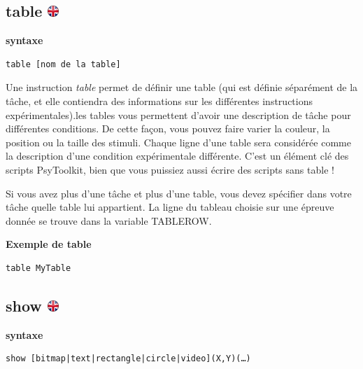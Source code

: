 \documentclass[
]{book}
\begin{document}
\hypertarget{table}{%
\subsection[table ]{\texorpdfstring{table
\href{https://www.psytoolkit.org/doc3.2.0/syntax.html\#table}{\protect\includegraphics{img/ukflag.png}}}{table }}\label{table}}

\textbf{syntaxe}

\begin{verbatim}
table [nom de la table]
\end{verbatim}

Une instruction \emph{table} permet de définir une table (qui est
définie séparément de la tâche, et elle contiendra des informations sur
les différentes instructions expérimentales).les tables vous permettent
d'avoir une description de tâche pour différentes conditions. De cette
façon, vous pouvez faire varier la couleur, la position ou la taille des
stimuli. Chaque ligne d'une table sera considérée comme la description
d'une condition expérimentale différente. C'est un élément clé des
scripts PsyToolkit, bien que vous puissiez aussi écrire des scripts sans
table !

Si vous avez plus d'une tâche et plus d'une table, vous devez spécifier
dans votre tâche quelle table lui appartient. La ligne du tableau
choisie sur une épreuve donnée se trouve dans la variable TABLEROW.

\textbf{Exemple de table}

\begin{verbatim}
table MyTable
\end{verbatim}

\hypertarget{show}{%
\subsection[show ]{\texorpdfstring{show
\href{https://www.psytoolkit.org/doc3.2.0/syntax.html\#task-show}{\protect\includegraphics{img/ukflag.png}}}{show }}\label{show}}

\textbf{syntaxe}

\begin{verbatim}
show [bitmap|text|rectangle|circle|video](X,Y)(…)
\end{verbatim}
\end{document}
